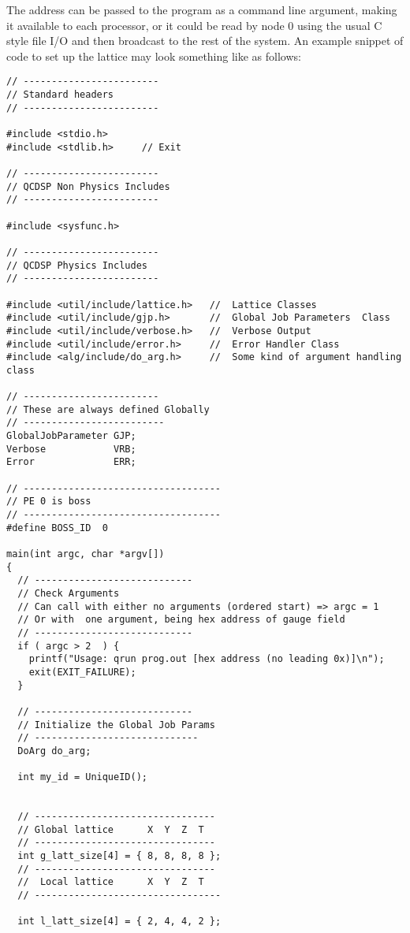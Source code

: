 The address can be passed to the program as a command line argument, 
making it available to each processor, or it could be read by node 0
using the usual C style file I/O and then broadcast to the rest of the
system. An example snippet of code to set up the lattice may look something
like as follows:
{\scriptsize
\begin{verbatim}
// ------------------------ 
// Standard headers
// ------------------------

#include <stdio.h>
#include <stdlib.h>     // Exit

// ------------------------
// QCDSP Non Physics Includes
// ------------------------

#include <sysfunc.h>

// ------------------------
// QCDSP Physics Includes
// ------------------------

#include <util/include/lattice.h>   //  Lattice Classes
#include <util/include/gjp.h>       //  Global Job Parameters  Class
#include <util/include/verbose.h>   //  Verbose Output 
#include <util/include/error.h>     //  Error Handler Class
#include <alg/include/do_arg.h>     //  Some kind of argument handling class

// ------------------------
// These are always defined Globally
// -------------------------
GlobalJobParameter GJP;
Verbose            VRB;
Error              ERR;

// -----------------------------------
// PE 0 is boss
// -----------------------------------
#define BOSS_ID  0

main(int argc, char *argv[]) 
{
  // ----------------------------
  // Check Arguments 
  // Can call with either no arguments (ordered start) => argc = 1
  // Or with  one argument, being hex address of gauge field 
  // ----------------------------
  if ( argc > 2  ) {
    printf("Usage: qrun prog.out [hex address (no leading 0x)]\n");
    exit(EXIT_FAILURE);
  }

  // ----------------------------
  // Initialize the Global Job Params
  // -----------------------------
  DoArg do_arg;

  int my_id = UniqueID();


  // --------------------------------
  // Global lattice      X  Y  Z  T 
  // --------------------------------
  int g_latt_size[4] = { 8, 8, 8, 8 };
  // --------------------------------
  //  Local lattice      X  Y  Z  T 
  // ---------------------------------

  int l_latt_size[4] = { 2, 4, 4, 2 };


\end{verbatim}}
